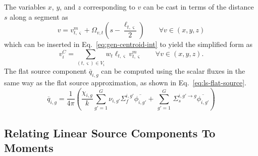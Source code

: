 The variables $x$, $y$, and $z$ corresponding to $v$ can be cast in terms of the distance $s$ along a segment as
\begin{equation}
v = v^m_{t,\varsigma} + \Omega_{v,t} \left(s - \frac{\ell_{t,\varsigma}}{2} \right) \qquad \forall v \in (x,y,z)
\label{eq:v-to-s}
\end{equation}
which can be inserted in Eq.~\ref{eq:gen-centroid-int} to yield the simplified form as
\begin{equation}
v^C_i = \sum_{(t,\varsigma) \in V_i} w_t \ell_{t,\varsigma} v^m_{t,\varsigma} \qquad \forall v \in (x,y,z).
\label{eq:gen-centroid-sum}
\end{equation}
The flat source component $\overline{q}_{i,g}$ can be computed using the scalar fluxes in the same way as the flat source approximation, as shown in Eq.~\ref{eq:ls-flat-source}.
\begin{equation}
\overline{q}_{i,g} = \frac{1}{4 \pi} \left( \frac{\chi_{i,g}}{k} \sum_{g'=1}^{G} \nu_{i,g'} \Sigma_f^{i,g'} \overline{\phi_{i,g'}} + \, \sum_{g'=1}^G \,  \Sigma_{s}^{i,g' \rightarrow g} \overline{\phi_{i,g'}} \right)
\label{eq:ls-flat-source}
\end{equation}

\subsection{Relating Linear Source Components To Moments}
\label{sec:ls-components}

